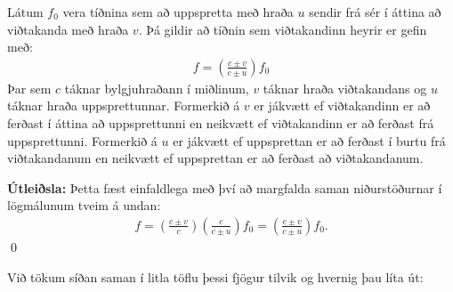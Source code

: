 \begin{tcolorbox}
\begin{theorem}
Látum $f_0$ vera tíðnina sem að uppspretta með hraða $u$ sendir frá sér í áttina að viðtakanda með hraða $v$. Þá gildir að tíðnin sem viðtakandinn heyrir er gefin með:
\begin{align*}
    f = \left( \frac{c \pm v}{c \pm u} \right)f_0
\end{align*}
Þar sem $c$ táknar bylgjuhraðann í miðlinum, $v$ táknar hraða viðtakandans og $u$ táknar hraða uppsprettunnar. Formerkið á $v$ er jákvætt ef viðtakandinn er að ferðast í áttina að uppsprettunni en neikvætt ef viðtakandinn er að ferðast frá uppsprettunni. Formerkið á $u$ er jákvætt ef uppsprettan er að ferðast í burtu frá viðtakandanum en neikvætt ef uppsprettan er að ferðast að viðtakandanum.
\end{theorem}
\end{tcolorbox}

\textbf{Útleiðsla:} Þetta fæst einfaldlega með því að margfalda saman niðurstöðurnar í lögmálunum tveim á undan:
\begin{align*}
    f = \left( \frac{c\pm v}{c} \right)\left( \frac{c}{c\pm u} \right)f_0 = \left( \frac{c \pm v}{c \pm u} \right)f_0.
\end{align*}
\qed

Við tökum síðan saman í litla töflu þessi fjögur tilvik og hvernig þau líta út:

